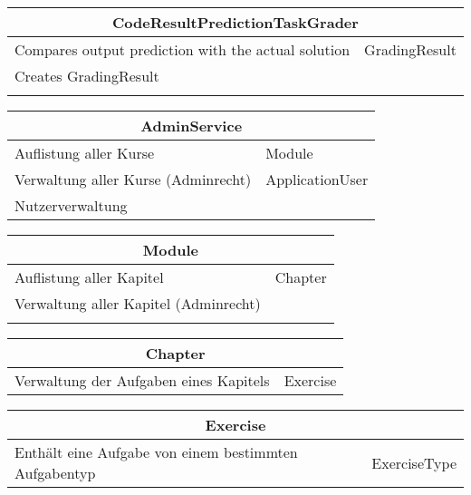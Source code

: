 \documentclass[11pt]{article}
\begin{document}
\begin{table}[h]
\begin{tabularx}{\textwidth}{|X|X|}
\hline
\multicolumn{2}{|c|}{CodeResultPredictionTaskGrader}\\ \hline
Compares output prediction with the actual solution& GradingResult  \\  \hline
Creates GradingResult &  \\ \hline
 & \\ \hline
\end{tabularx}

\end{table}

\begin{table}[h]
\begin{tabularx}{\textwidth}{|X|X|}
\hline
\multicolumn{2}{|c|}{AdminService}\\ \hline
Auflistung aller Kurse & Module  \\  \hline
Verwaltung aller Kurse (Adminrecht) & ApplicationUser \\ \hline
Nutzerverwaltung & \\ \hline
\end{tabularx}
\end{table}

\begin{table}[h]
\begin{tabularx}{\textwidth}{|X|X|}
\hline
\multicolumn{2}{|c|}{Module}\\ \hline
Auflistung aller Kapitel & Chapter  \\  \hline
Verwaltung aller Kapitel (Adminrecht) & \\ \hline
 & \\ \hline
\end{tabularx}
\end{table}

\begin{table}[h]
\begin{tabularx}{\textwidth}{|X|X|}
\hline
\multicolumn{2}{|c|}{Chapter}\\ \hline
Verwaltung der Aufgaben eines Kapitels & Exercise   \\  \hline
\end{tabularx}

\end{table}

\begin{table}[h]
\begin{tabularx}{\textwidth}{|X|X|}
\hline
\multicolumn{2}{|c|}{Exercise}\\ \hline
Enthält eine Aufgabe von einem bestimmten Aufgabentyp & ExerciseType   \\  \hline
\end{tabularx}

\end{table}
\end{document}
